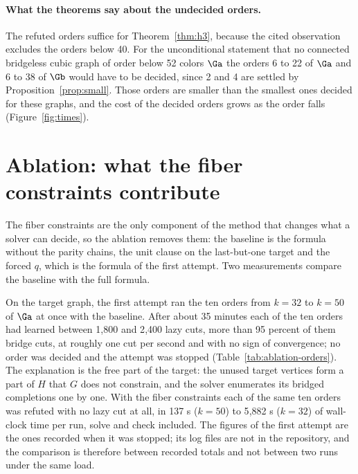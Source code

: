 

\paragraph{What the theorems say about the undecided orders.} The refuted orders suffice for Theorem~\ref{thm:h3}, because the cited observation excludes the orders below 40. For the unconditional statement that no connected bridgeless cubic graph of order below 52 colors $\Ga$ the orders 6 to 22 of $\Ga$ and 6 to 38 of $\Gb$ would
have to be decided, since 2 and 4 are settled by Proposition~\ref{prop:small}. Those orders are smaller than the smallest ones decided for these graphs, and the cost of the decided orders grows as the order falls (Figure~\ref{fig:times}).

\section{Ablation: what the fiber constraints contribute}\label{sec:ablation}

The fiber constraints are the only component of the method that changes what a solver can decide, so the ablation removes them: the baseline is the formula without the parity chains, the unit clause on the last-but-one target and the forced $q$, which is the formula of the first attempt. Two measurements compare the baseline with the full formula.

On the target graph, the first attempt ran the ten orders from $k = 32$ to $k = 50$ of $\Ga$ at once with the baseline. After about 35 minutes each of the ten orders had learned between 1{,}800 and 2{,}400 lazy cuts, more than 95 percent of them bridge cuts, at roughly one cut per second and with no sign of convergence; no order was decided and the attempt was stopped (Table~\ref{tab:ablation-orders}).
The explanation is the free part of the target: the unused target vertices form a part of $H$ that $G$ does not constrain, and the solver enumerates its bridged completions one by one. With the fiber constraints each of the same ten orders was refuted with no lazy cut at all, in 137 s ($k = 50$) to 5{,}882 s ($k = 32$) of wall-clock time per run, solve and check included. The figures of the first attempt are the ones recorded
when it was stopped; its log files are not in the repository, and the comparison is therefore between recorded totals and not between two runs under the same load.

